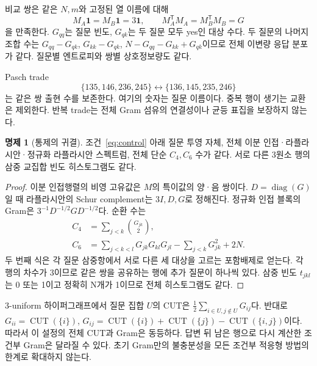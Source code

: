 \documentclass[11pt,a4paper]{article}
\theoremstyle{definition}
\newtheorem{proposition}[theorem]{명제}
\theoremstyle{remark}\newtheorem{remark}[theorem]{주석}
\newcommand{\Gram}{G}
\newcommand{\CUT}{\operatorname{CUT}}
\begin{document}
비교 쌍은 같은 $N,m$와 고정된 열 이름에 대해
\begin{equation}\label{eq:control}
 M_A\mathbf1=M_B\mathbf1=3\mathbf1,\qquad
 M_A^{\mathsf T}M_A=M_B^{\mathsf T}M_B=\Gram
\end{equation}
을 만족한다. $G_{qq}$는 질문 빈도, $G_{qk}$는 두 질문 모두 yes인 대상 수다. 두 질문의 나머지 조합 수는 $G_{qq}-G_{qk}$, $G_{kk}-G_{qk}$, $N-G_{qq}-G_{kk}+G_{qk}$이므로 전체 이변량 응답 분포가 같다. 질문별 엔트로피와 쌍별 상호정보량도 같다.

Pasch trade
\begin{equation}\label{eq:pasch}
 \{135,146,236,245\}\longleftrightarrow\{136,145,235,246\}
\end{equation}
는 같은 쌍 출현 수를 보존한다. 여기의 숫자는 질문 이름이다. 중복 행이 생기는 교환은 제외한다. 반복 trade는 전체 Gram 섬유의 연결성이나 균등 표집을 보장하지 않는다\cite{diaconis}.

\begin{proposition}[통제의 귀결]\label{prop:invariants}
조건~\eqref{eq:control} 아래 질문 투영 자체, 전체 이분 인접·라플라시안·정규화 라플라시안 스펙트럼, 전체 단순 $C_4,C_6$ 수가 같다. 서로 다른 3원소 행의 삼중 교집합 빈도 히스토그램도 같다.
\end{proposition}
\begin{proof}
이분 인접행렬의 비영 고유값은 $M$의 특이값의 양·음 쌍이다. $D=\operatorname{diag}(G)$일 때 라플라시안의 Schur complement는 $3I,D,G$로 정해진다. 정규화 인접 블록의 Gram은 $3^{-1}D^{-1/2}GD^{-1/2}$다. 순환 수는
\begin{align}
 C_4&=\sum_{j<k}\binom{G_{jk}}2,\\
 C_6&=\sum_{j<k<l}G_{jk}G_{kl}G_{jl}-\sum_{j<k}G_{jk}^2+2N.
\end{align}
두 번째 식은 각 질문 삼중항에서 서로 다른 세 대상을 고르는 포함배제로 얻는다. 각 행의 차수가 3이므로 같은 쌍을 공유하는 행에 추가 질문이 하나씩 있다. 삼중 빈도 $t_{jkl}$는 0 또는 1이고 정확히 N개가 1이므로 전체 히스토그램도 같다.
\end{proof}
3-uniform 하이퍼그래프에서 질문 집합 $U$의 CUT은 $\frac12\sum_{i\in U,j\notin U}G_{ij}$다. 반대로 $G_{ii}=\CUT(\{i\})$, $G_{ij}=\CUT(\{i\})+\CUT(\{j\})-\CUT(\{i,j\})$이다. 따라서 이 설정의 전체 CUT과 Gram은 동등하다. 답변 뒤 남은 행으로 다시 계산한 조건부 Gram은 달라질 수 있다. 초기 Gram만의 불충분성을 모든 조건부 적응형 방법의 한계로 확대하지 않는다.
\end{document}
